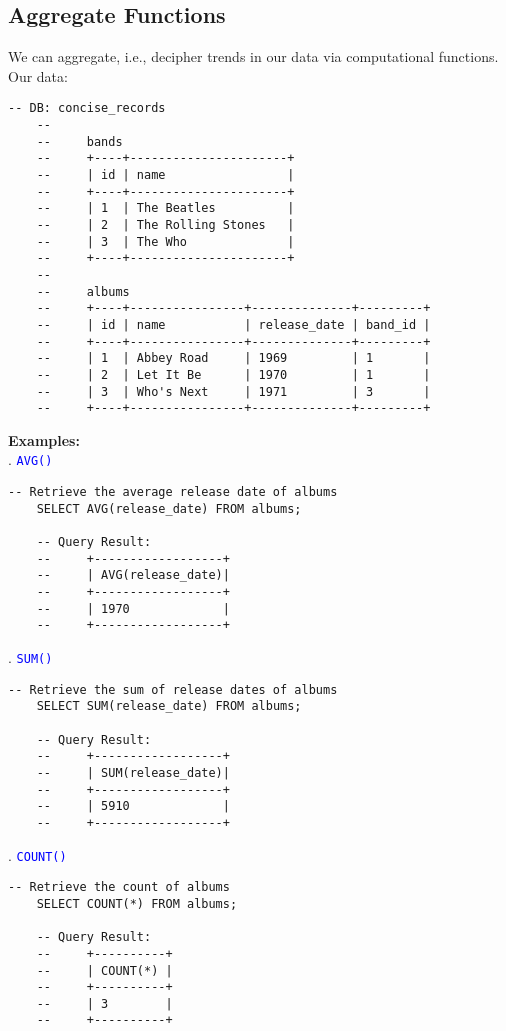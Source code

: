 
\subsection{Aggregate Functions}

\noindent
We can aggregate, i.e., decipher trends in our data via computational functions. Our data:

\begin{lstlisting}[style=sql]
    -- DB: concise_records
    --
    --     bands
    --     +----+----------------------+
    --     | id | name                 |
    --     +----+----------------------+
    --     | 1  | The Beatles          |
    --     | 2  | The Rolling Stones   |
    --     | 3  | The Who              |
    --     +----+----------------------+
    --    
    --     albums
    --     +----+----------------+--------------+---------+
    --     | id | name           | release_date | band_id |
    --     +----+----------------+--------------+---------+
    --     | 1  | Abbey Road     | 1969         | 1       |
    --     | 2  | Let It Be      | 1970         | 1       |
    --     | 3  | Who's Next     | 1971         | 3       |
    --     +----+----------------+--------------+---------+
\end{lstlisting}

\noindent
\textbf{Examples:}\\

. \textcolor{blue}{\texttt{AVG()}}
\begin{lstlisting}[style=sql]
    -- Retrieve the average release date of albums
    SELECT AVG(release_date) FROM albums;

    -- Query Result:
    --     +------------------+
    --     | AVG(release_date)|
    --     +------------------+
    --     | 1970             |
    --     +------------------+
\end{lstlisting}
. \textcolor{blue}{\texttt{SUM()}}
\begin{lstlisting}[style=sql]
    -- Retrieve the sum of release dates of albums
    SELECT SUM(release_date) FROM albums;

    -- Query Result:
    --     +------------------+
    --     | SUM(release_date)|
    --     +------------------+
    --     | 5910             |
    --     +------------------+
\end{lstlisting}
. \textcolor{blue}{\texttt{COUNT()}}
\begin{lstlisting}[style=sql]
    -- Retrieve the count of albums
    SELECT COUNT(*) FROM albums;

    -- Query Result:
    --     +----------+
    --     | COUNT(*) |
    --     +----------+
    --     | 3        |
    --     +----------+
\end{lstlisting}

